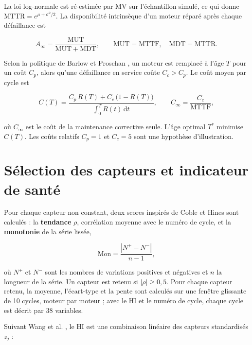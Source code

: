 La loi log-normale est ré-estimée par MV sur l'échantillon simulé, ce qui donne $\mathrm{MTTR} = e^{\mu + \sigma^2/2}$. La disponibilité intrinsèque d'un moteur réparé après chaque défaillance est

\begin{equation}\label{eq:dispo}
A_\infty = \frac{\mathrm{MUT}}{\mathrm{MUT} + \mathrm{MDT}}, \qquad \mathrm{MUT} = \mathrm{MTTF}, \quad \mathrm{MDT} = \mathrm{MTTR}.
\end{equation}

Selon la politique de Barlow et Proschan \cite{barlow1965}, un moteur est remplacé à l'âge $T$ pour un coût $C_p$, alors qu'une défaillance en service coûte $C_c > C_p$. Le coût moyen par cycle est

\begin{equation}\label{eq:cout}
C(T) = \frac{C_p\, R(T) + C_c\, \big(1 - R(T)\big)}{\displaystyle\int_0^T R(t)\, \mathrm{d}t}, \qquad C_\infty = \frac{C_c}{\mathrm{MTTF}} ,
\end{equation}

où $C_\infty$ est le coût de la maintenance corrective seule. L'âge optimal $T^*$ minimise $C(T)$. Les coûts relatifs $C_p = 1$ et $C_c = 5$ sont une hypothèse d'illustration.

\section{Sélection des capteurs et indicateur de santé}\label{sec:hi}

Pour chaque capteur non constant, deux scores inspirés de Coble et Hines \cite{coble2009} sont calculés : la \textbf{tendance} $\rho$, corrélation moyenne avec le numéro de cycle, et la \textbf{monotonie} de la série lissée,

\begin{equation}\label{eq:monotonie}
\mathrm{Mon} = \frac{|N^{+} - N^{-}|}{n-1},
\end{equation}

où $N^{+}$ et $N^{-}$ sont les nombres de variations positives et négatives et $n$ la longueur de la série. Un capteur est retenu si $|\rho| \ge 0{,}5$. Pour chaque capteur retenu, la moyenne, l'écart-type et la pente sont calculés sur une fenêtre glissante de 10 cycles, moteur par moteur ; avec le HI et le numéro de cycle, chaque cycle est décrit par 38 variables.

Suivant Wang et al. \cite{wang2008}, le HI est une combinaison linéaire des capteurs standardisés $z_j$ :

